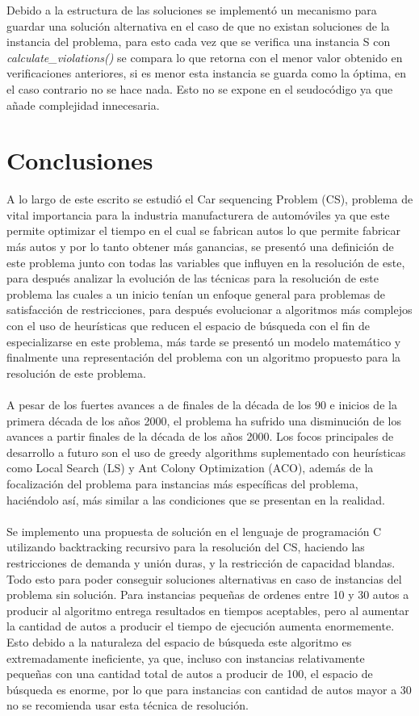 \documentclass[letter, 10pt]{article}
\begin{document}
Debido a la estructura de las soluciones se implement\'o un mecanismo para guardar una soluci\'on alternativa en el caso de que no existan soluciones de la instancia del problema, para esto cada vez que se verifica una instancia S con \textit{calculate\_violations()} se compara lo que retorna con el menor valor obtenido en verificaciones anteriores, si es menor esta instancia se guarda como la \'optima, en el caso contrario no se hace nada. Esto no se expone en el seudoc\'odigo ya que a\~{n}ade complejidad innecesaria.
\section{Conclusiones}
A lo largo de este escrito se estudi\'o el Car sequencing Problem (CS), problema de vital importancia para la industria manufacturera de autom\'oviles ya que este permite optimizar el tiempo en el cual se fabrican autos lo que permite fabricar m\'as autos y por lo tanto obtener m\'as ganancias, se present\'o una definici\'on de este problema junto con todas las variables que influyen en la resoluci\'on de este, para despu\'es analizar la evoluci\'on de las t\'ecnicas para la resoluci\'on de este problema las cuales a un inicio ten\'ian un enfoque general para problemas de satisfacci\'on de restricciones, para despu\'es evolucionar a algoritmos m\'as complejos con el uso de heur\'isticas que reducen el espacio de b\'usqueda con el fin de especializarse en este problema, m\'as tarde se present\'o un modelo matem\'atico y finalmente una representaci\'on del problema con un algoritmo propuesto para la resoluci\'on de este problema.\\\\
A pesar de los fuertes avances a de finales de la d\'ecada de los 90 e inicios de la primera d\'ecada de los a\~{n}os 2000, el problema ha sufrido una disminuci\'on de los avances a partir finales de la d\'ecada de los a\~{n}os 2000. Los focos principales de desarrollo a futuro son el uso de greedy algorithms suplementado con heur\'isticas como Local Search (LS) y Ant Colony Optimization (ACO), adem\'as de la focalizaci\'on del problema para instancias m\'as espec\'ificas del problema, haci\'endolo as\'i, m\'as similar a las condiciones que se presentan en la realidad.\\\\
Se implemento una propuesta de soluci\'on en el lenguaje de programaci\'on C utilizando backtracking recursivo para la resoluci\'on del CS, haciendo las restricciones de demanda y uni\'on duras, y la restricci\'on de capacidad blandas. Todo esto para poder conseguir soluciones alternativas en caso de instancias del problema sin soluci\'on. Para instancias peque\~{n}as de ordenes entre 10 y 30 autos a producir al algoritmo entrega resultados en tiempos aceptables, pero al aumentar la cantidad de autos a producir el tiempo de ejecuci\'on aumenta enormemente. Esto debido a la naturaleza del espacio de b\'usqueda este algoritmo es extremadamente ineficiente, ya que, incluso con instancias relativamente peque\~{n}as con una cantidad total de autos a producir de 100, el espacio de b\'usqueda es enorme, por lo que para instancias con cantidad de autos mayor a 30 no se recomienda usar esta t\'ecnica de resoluci\'on.\\\\
\end{document}
